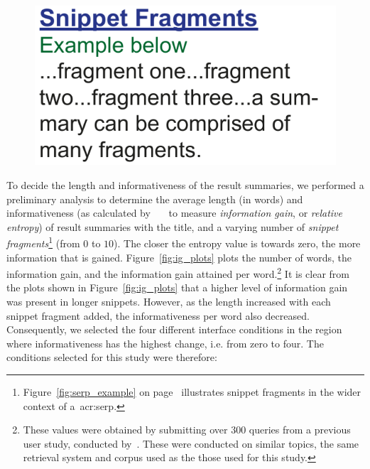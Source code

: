 \begin{figure}
    \begin{center}
    \vspace*{-10mm}
    \includegraphics[width=1\textwidth]{figures/ch7-fragments.pdf}
    \end{center}
    \vspace*{-4mm}
    \label{fig:fragments}
\end{figure}

To decide the length and informativeness of the result summaries, we performed a preliminary analysis to determine the average length (in words) and informativeness (as calculated by~~\citep{kullback1951information}~\citep{kullback1951information} to measure \emph{information gain}, or \emph{relative entropy}) of result summaries with the title, and a varying number of \emph{snippet fragments}\footnote{Figure~\ref{fig:serp_example} on page~\pageref{fig:serp_example} illustrates snippet fragments in the wider context of a~\gls{acr:serp}.} (from $0$ to $10$). The closer the entropy value is towards zero, the more information that is gained. Figure~\ref{fig:ig_plots} plots the number of words, the information gain, and the information gain attained per word.\footnote{These values were obtained by submitting over $300$ queries from a previous user study, conducted by~\cite{azzopardi2013query_cost}. These were conducted on similar topics, the same retrieval system and corpus used as the those used for this study.} It is clear from the plots shown in Figure~\ref{fig:ig_plots} that a higher level of information gain was present in longer snippets. However, as the length increased with each snippet fragment added, the informativeness per word also decreased. Consequently, we selected the four different interface conditions in the region where informativeness has the highest change, i.e. from zero to four. The conditions selected for this study were therefore:

